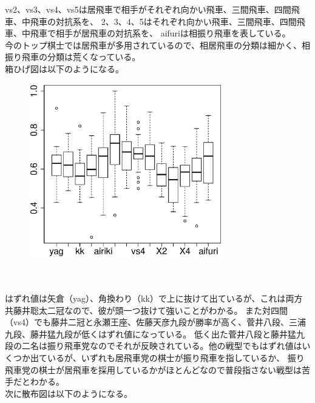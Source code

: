 \documentclass[11pt,a4paper,dvipdfmx]{jsarticle}
\begin{document}
vs2、vs3、vs4、vs5は居飛車で相手がそれぞれ向かい飛車、三間飛車、四間飛車、中飛車の対抗系を、
2、3、4、5はそれぞれ向かい飛車、三間飛車、四間飛車、中飛車で相手が居飛車の対抗系を、
aifuriは相振り飛車を表している。
\\
今のトップ棋士では居飛車が多用されているので、相居飛車の分類は細かく、相振り飛車の分類は荒くなっている。
\\
箱ひげ図は以下のようになる。
\begin{figure}[h]
    \centering
    \includegraphics[width=0.75\textwidth]{graph/boxplot-raw.eps}
\end{figure}
\\
\\
はずれ値は矢倉（yag）、角換わり（kk）で上に抜けて出ているが、これは両方共藤井聡太二冠なので、彼が頭一つ抜けて強いことがわかる。
また対四間（vs4）でも藤井二冠と永瀬王座、佐藤天彦九段が勝率が高く、菅井八段、三浦九段、藤井猛九段が低くはずれ値になっている。
低く出た菅井八段と藤井猛九段の二名は振り飛車党なのでそれが反映されている。他の戦型でもはずれ値はいくつか出ているが、いずれも居飛車党の棋士が振り飛車を指しているか、
振り飛車党の棋士が居飛車を採用しているかがほとんどなので普段指さない戦型は苦手だとわかる。
\\
次に散布図は以下のようになる。
\end{document}

